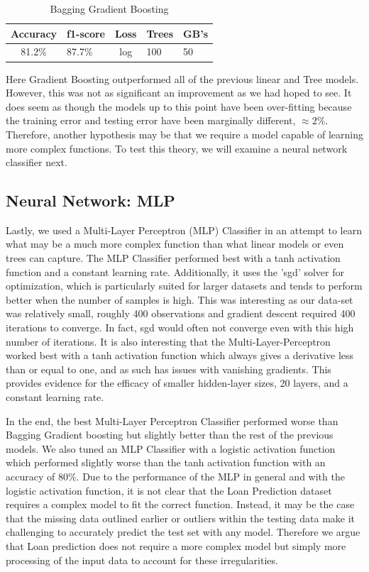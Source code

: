 \documentclass[conference]{IEEEtran}
\begin{document}
\begin{table}[H]
\centering
  \begin{tabular}{|c|l|c|l|l|} \hline 
 
 Accuracy&  f1-score&Loss& Trees&GB's\\ \hline 

 81.2\%&  87.7\%&log& 100&50\\\hline 
\end{tabular}

 \caption{Bagging Gradient Boosting}
 \end{table}

Here Gradient Boosting outperformed all of the previous linear and Tree models. However, this was not as significant an improvement as we had hoped to see. It does seem as though the models up to this point have been over-fitting because the training error and testing error have been marginally different, $\approx 2\%$. Therefore, another hypothesis may be that we require a model capable of learning more complex functions. To test this theory, we will examine a neural network classifier next.

\subsection{Neural Network: MLP}
Lastly, we used a Multi-Layer Perceptron (MLP) Classifier in an attempt to learn what may be a much more complex function than what linear models or even trees can capture. The MLP Classifier performed best with a tanh activation function and a constant learning rate. Additionally, it uses the 'sgd' solver for optimization, which is particularly suited for larger datasets and tends to perform better when the number of samples is high. This was interesting as our data-set was relatively small, roughly 400 observations and gradient descent required 400 iterations to converge. In fact, sgd would often not converge even with this high number of iterations. It is also interesting that the Multi-Layer-Perceptron worked best with a tanh activation function which always gives a derivative less than or equal to one, and as such has issues with vanishing gradients. This provides evidence for the efficacy of smaller hidden-layer sizes, 20 layers, and a constant learning rate.

In the end, the best Multi-Layer Perceptron Classifier performed worse than Bagging Gradient boosting but slightly better than the rest of the previous models. We also tuned an MLP Classifier with a logistic activation function which performed slightly worse than the tanh activation function with an accuracy of $80\%$. Due to the performance of the MLP in general and with the logistic activation function, it is not clear that the Loan Prediction dataset requires a complex model to fit the correct function. Instead, it may be the case that the missing data outlined earlier or outliers within the testing data make it challenging to accurately predict the test set with any model. Therefore we argue that Loan prediction does not require a more complex model but simply more processing of the input data to account for these irregularities.
\end{document}
